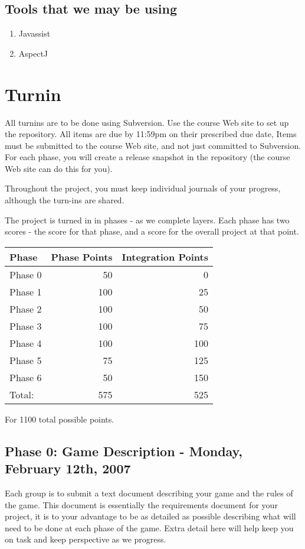 \documentclass[11pt]{exam}
\begin{document}
\subsection{Tools that we may be using}
\begin{enumerate}
	\item Javassist
	\item AspectJ
\end{enumerate}


\section{Turnin}
All turnins are to be done using Subversion.  Use the course Web site to set up the repository. \newline
All items are due by 11:59pm on their prescribed due date, Items must be submitted to the course Web site, and not just committed to Subversion.   For each phase, you will create a release snapshot in the repository (the course Web site can do this for you).

\par
Throughout the project, you must keep individual journals of your progress, although the turn-ins are shared.

\par
The project is turned in in phases - as we complete layers.  Each phase has two scores - the score for that phase, and a score for the overall project at that point.

\begin{tabular}{|l||r|r|} \hline
{\bf Phase} & {\bf Phase Points} & {\bf Integration Points} \\ \hline \hline
Phase 0 &  50 & 0 \\ \hline
Phase 1 & 100 & 25 \\ \hline 
Phase 2 & 100 & 50 \\ \hline
Phase 3 & 100 & 75 \\  \hline
Phase 4 & 100 & 100 \\ \hline
Phase 5 &  75 & 125 \\ \hline
Phase 6 &  50 & 150 \\ \hline \hline
Total:  & 575 & 525 \\ \hline
\end{tabular}
For 1100 total possible points.

\subsection{Phase 0: Game Description - Monday, February 12th, 2007}
Each group is to submit a text document describing your game and the rules of the game.   This document is essentially the requirements document for your project, it is to your advantage to be as detailed as possible describing what will need to be done at each phase of the game.   Extra detail here will help keep you on task and keep perspective as we progress.
\end{document}

